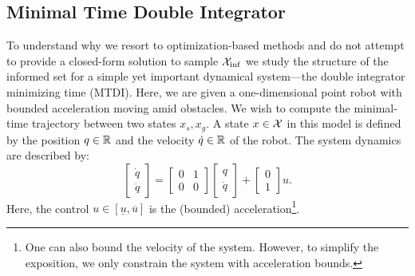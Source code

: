 \documentclass[letterpaper, 10 pt, conference]{ieeeconf}  %
\begin{document}


\subsection{Minimal Time Double Integrator}
To understand why we resort to optimization-based methods and do not attempt to provide a closed-form solution to sample $\mathcal{X}_{\rm {inf}}$ we study the structure of the informed set for a simple yet important dynamical system---the double integrator minimizing time (MTDI). 
Here, we are given a one-dimensional point robot with bounded acceleration moving amid obstacles. We wish to compute the minimal-time trajectory between two states $x_s, x_g$.
A state $x \in \mathcal{X}$ in this model is defined by 
the position $q \in \mathbb{R}$
and
the velocity $\dot{q}\in \mathbb{R}$ of the robot.
The system dynamics are described by:
\begin{equation}
\begin{bmatrix}
	\dot{q} \\
	\ddot{q}
\end{bmatrix}
=
\begin{bmatrix}
	0 & 1 \\
	0 & 0
\end{bmatrix}
\begin{bmatrix}
	{q} \\
	\dot{q}
\end{bmatrix}
+
\begin{bmatrix}
	0 \\
	1
\end{bmatrix}
u.
\end{equation}
Here, the control 
$u \in [\underline{u}, \overline{u}]$ 
is the (bounded) acceleration\footnote{One can also bound the velocity of the system. However, to simplify the exposition, we only constrain the system with acceleration bounds.}. 
\end{document}
